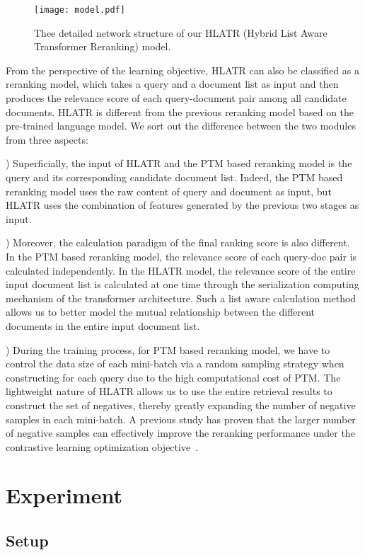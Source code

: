 \documentclass[11pt]{article}
\begin{document}
\begin{figure}[t]
    \centering
    \texttt{[image: model.pdf]}   
    \caption{Thee detailed network structure of our HLATR (Hybrid List Aware Transformer Reranking) model.}
    \label{fig:hltar}
\end{figure}

From the perspective of the learning objective, HLATR can also be classified as a reranking model, which takes a query  and a document list as input and then produces the relevance score of each query-document pair among all candidate documents. HLATR is different from the previous reranking model based on the pre-trained language model. We sort out the difference between the two modules from three aspects:

) Superficially, the input of HLATR and the PTM based reranking model is the query  and its corresponding candidate document list. Indeed, the PTM based reranking model uses the raw content of query and document as input, but HLATR uses the combination of features generated by the previous two stages as input. 

) Moreover, the calculation paradigm of the final ranking score is also different. In the PTM based reranking model, the relevance score of each query-doc pair is calculated independently. In the HLATR model, the relevance score of the entire input document list is calculated at one time through the serialization computing mechanism of the transformer architecture. Such a list aware calculation method allows us to better model the mutual relationship between the different documents in the entire input document list.

) During the training process, for PTM based reranking model, we have to control the data size of each mini-batch via a random sampling strategy when constructing  for each query  due to the high computational cost of PTM. The lightweight nature of HLATR allows us to use the entire retrieval results to construct the set of negatives, thereby greatly expanding the number of negative samples in each mini-batch. A previous study has proven that the larger number of negative samples can effectively improve the reranking performance under the contrastive learning optimization objective~\cite{gao2021rethink}.

\section{Experiment}
\subsection{Setup}
\end{document}

